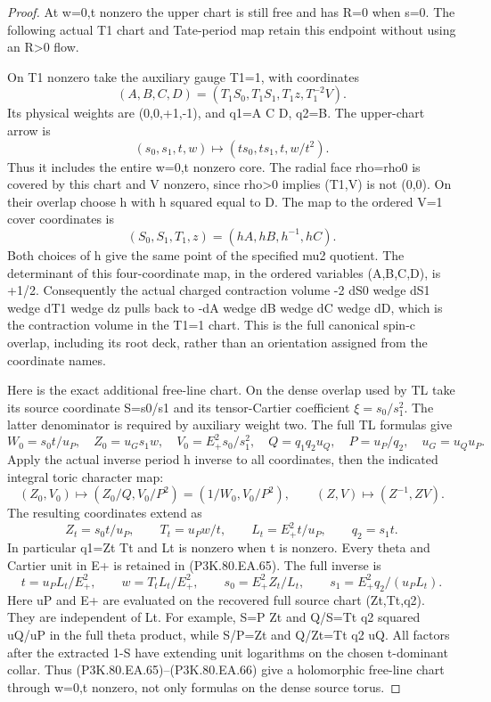 \begin{proof}
At w=0,t nonzero the upper chart is still free and has R=0
when s=0. The following actual T1 chart and Tate-period map
retain this endpoint without using an R>0 flow.

On T1 nonzero take the auxiliary gauge T1=1, with coordinates
\[
 (A,B,C,D)=(T_1S_0,T_1S_1,T_1z,T_1^{-2}V).
 \tag{P3K.80.EA.60}
\]
Its physical weights are (0,0,+1,-1), and
q1=A C D, q2=B. The upper-chart arrow is
\[
 (s_0,s_1,t,w)\longmapsto
                   (ts_0,ts_1,t,w/t^2).
 \tag{P3K.80.EA.61}
\]
Thus it includes the entire w=0,t nonzero core.
The radial face rho=rho0 is covered by this chart and V
nonzero, since rho>0 implies (T1,V) is not (0,0).
On their overlap choose h with h squared equal to D. The
map to the ordered V=1 cover coordinates is
\[
 (S_0,S_1,T_1,z)=(hA,hB,h^{-1},hC).
 \tag{P3K.80.EA.62}
\]
Both choices of h give the same point of the specified mu2
quotient. The determinant of this four-coordinate map,
in the ordered variables (A,B,C,D), is +1/2. Consequently
the actual charged contraction volume
-2 dS0 wedge dS1 wedge dT1 wedge dz pulls back to
-dA wedge dB wedge dC wedge dD, which is the contraction
volume in the T1=1 chart. This is the full canonical
spin-c overlap, including its root deck, rather than an
orientation assigned from the coordinate names.

Here is the exact additional free-line chart. On the dense
overlap used by TL take its source coordinate S=s0/s1
and its tensor-Cartier coefficient \(\xi=s_0/s_1^2\).
The latter denominator is required by auxiliary weight two.
The full TL formulas give
\[
 W_0=s_0t/u_P,\quad Z_0=u_Gs_1w,\quad
 V_0=E_+^2s_0/s_1^2,\quad
 Q=q_1q_2u_Q,\quad P=u_P/q_2,\quad u_G=u_Qu_P .
 \tag{P3K.80.EA.63}
\]
Apply the actual inverse period h inverse to all coordinates,
then the indicated integral toric character map:
\[
 (Z_0,V_0)\longmapsto(Z_0/Q,V_0/P^2)=(1/W_0,V_0/P^2),
 \qquad (Z,V)\longmapsto(Z^{-1},ZV).
 \tag{P3K.80.EA.64}
\]
The resulting coordinates extend as
\[
 Z_t=s_0t/u_P,\qquad T_t=u_Pw/t,\qquad
 L_t=E_+^2t/u_P,\qquad q_2=s_1t .
 \tag{P3K.80.EA.65}
\]
In particular q1=Zt Tt and Lt is nonzero when t is nonzero.
Every theta and Cartier unit in E+ is retained in (P3K.80.EA.65).
The full inverse is
\[
 t=u_PL_t/E_+^2,\qquad w=T_tL_t/E_+^2,\qquad
 s_0=E_+^2Z_t/L_t,\qquad
 s_1=E_+^2q_2/(u_PL_t).
 \tag{P3K.80.EA.66}
\]
Here uP and E+ are evaluated on the recovered full source
chart (Zt,Tt,q2). They are independent of Lt. For example,
S=P Zt and Q/S=Tt q2 squared uQ/uP in the full theta
product, while S/P=Zt and Q/Zt=Tt q2 uQ. All factors
after the extracted 1-S have extending unit logarithms on
the chosen t-dominant collar. Thus (P3K.80.EA.65)--(P3K.80.EA.66) give
a holomorphic free-line chart through w=0,t nonzero, not
only formulas on the dense source torus.


\end{proof}
